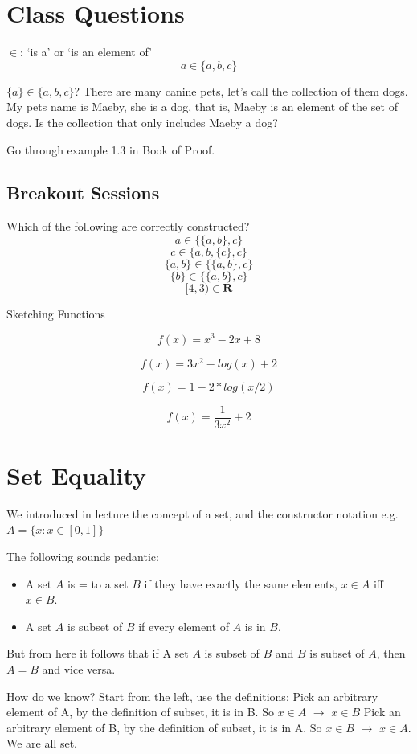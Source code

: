 \documentclass[12pt]{article}
\begin{document}
\section{Class Questions}

$\in$: `is a' or `is an element of'
$$a \in \{a, b, c\}$$

$\{a\} \in \{a, b, c\}$?
There are many canine pets, let's call the collection of them dogs.
My pets name is Maeby, she is a dog, that is, Maeby is an element of the set of dogs.
Is the collection that only includes Maeby a dog?

Go through example 1.3 in Book of Proof.



\subsection{Breakout Sessions}
Which of the following are correctly constructed?
$$a \in \{\{a, b\}, c\}$$
$$c \in \{a,b,\{c\}, c\}$$
$$\{a,b\} \in \{\{a, b\}, c\}$$
$$\{b\} \in \{\{a, b\}, c\}$$
$$[4, 3) \in \mathbf{R}$$

Sketching Functions

$$f(x)=x^3-2x+8$$

$$f(x)=3x^2-log(x)+2$$

$$f(x)=1-2*log(x/2)$$

$$f(x)=\frac{1}{3x^2}+2$$

\pagebreak
\section{Set Equality}

We introduced in lecture the concept of a set, and the constructor notation
e.g. $A=\{x: x \in [0,1]\}$

The following sounds pedantic:\\
\begin{itemize}
\item A set $A$ is = to a set $B$ if they have exactly the same elements, $x\in A$ iff $x\in B$.\\
\item A set $A$ is subset of $B$ if every element of $A$ is in $B$.\\
\end{itemize}
But from here it follows that if A set $A$ is subset of $B$ and $B$ is subset of $A$, then $A=B$ and vice versa.

How do we know?  
Start from the left, use the definitions:
Pick an arbitrary element of A, by the definition of subset, it is in B. So  $x\in A$ $\rightarrow$ $x\in B$
Pick an arbitrary element of B, by the definition of subset, it is in A.  So  $x\in B$ $\rightarrow$ $x\in A$.
We are all set.
\end{document}
